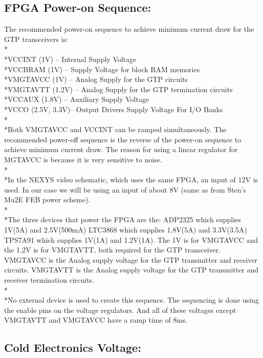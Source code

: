\subsection{FPGA Power-on Sequence: }

The recommended power-on sequence to achieve minimum current draw for the GTP transceivers is:
\\*
\\*VCCINT (1V) – Internal Supply Voltage
\\*VCCBRAM (1V) – Supply Voltage for block RAM memories
\\*VMGTAVCC (1V) – Analog Supply for the GTP circuits
\\*VMGTAVTT (1.2V) – Analog Supply for the GTP termination circuits
\\*VCCAUX (1.8V) – Auxiliary Supply Voltage
\\*VCCO (2.5V, 3.3V)– Output Drivers Supply Voltage For I/O Banks
\\*
\\*Both VMGTAVCC and VCCINT can be ramped simultaneously. The recommended
power-off sequence is the reverse of the power-on sequence to achieve minimum current draw. The reason for using a linear regulator for  MGTAVCC is because it is very sensitive to noise.
\\*
\\*In the NEXYS video schematic, which uses the same FPGA, an input of 12V is used. In our case we will be using an input of about 8V (same as from Sten’s Mu2E FEB power scheme). 
\\*
\\*The three devices that power the FPGA are the:
 ADP2325 which supplies 1V(5A) and 2.5V(500mA)
LTC3868 which supplies 1.8V(5A) and 3.3V(3.5A)
TPS7A91 which supplies 1V(1A) and 1.2V(1A). 
The 1V is for VMGTAVCC and the  1.2V is for VMGTAVTT, both required for the GTP transceiver. VMGTAVCC is the Analog supply voltage for the GTP transmitter and receiver circuits. VMGTAVTT is the Analog supply voltage for the GTP transmitter and receiver termination circuits. 
\\*
\\*No external device is used to create this sequence. 
The sequencing is done using the enable pins on the voltage regulators. And all of these voltages except VMGTAVTT and VMGTAVCC have a ramp time of 8ms. 
 

\subsection{Cold Electronics Voltage: }

